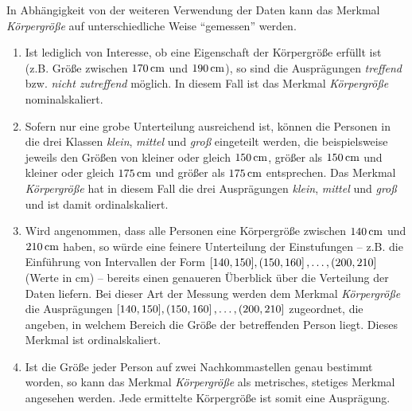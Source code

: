 \documentclass{lecture}
\begin{document}
    \begin{example}
        In Abhängigkeit von der weiteren Verwendung der Daten kann das Merkmal \emph{Körpergröße} auf unterschiedliche Weise ``gemessen'' werden.
        \begin{enumerate}
            \item Ist lediglich von Interesse, ob eine Eigenschaft der Körpergröße erfüllt ist (z.B. Größe zwischen \(170\,\si{\centi\meter}\) und \(190\,\si{\centi\meter}\)), so sind die Ausprägungen \emph{treffend} bzw. \emph{nicht zutreffend} möglich.
            In diesem Fall ist das Merkmal \emph{Körpergröße} nominalskaliert.
            \item Sofern nur eine grobe Unterteilung ausreichend ist, können die Personen in die drei Klassen \emph{klein}, \emph{mittel} und \emph{groß} eingeteilt werden, die beispielsweise jeweils den Größen von kleiner oder gleich \(150\,\si{\centi\meter}\), größer als \(150\,\si{\centi\meter}\) und kleiner oder gleich \(175\,\si{\centi\meter}\) und größer als \(175\,\si{\centi\meter}\) entsprechen.
            Das Merkmal \emph{Körpergröße} hat in diesem Fall die drei Ausprägungen \emph{klein}, \emph{mittel} und \emph{groß} und ist damit ordinalskaliert.
            \item Wird angenommen, dass alle Personen eine Körpergröße zwischen \(140\,\si{\centi\meter}\) und \(210\,\si{\centi\meter}\) haben, so würde eine feinere Unterteilung der Einstufungen -- z.B. die Einführung von Intervallen der Form \(\brackets*{140, 150}, \left(150, 160\right], \ldots, \left(200, 210\right]\) (Werte in \si{\centi\meter}) -- bereits einen genaueren Überblick über die Verteilung der Daten liefern.
            Bei dieser Art der Messung werden dem Merkmal \emph{Körpergröße} die Ausprägungen \(\brackets*{140, 150}, \left(150, 160\right], \ldots, \left(200, 210\right]\) zugeordnet, die angeben, in welchem Bereich die Größe der betreffenden Person liegt.
            Dieses Merkmal ist ordinalskaliert.
            \item Ist die Größe jeder Person auf zwei Nachkommastellen genau bestimmt worden, so kann das Merkmal \emph{Körpergröße} als metrisches, stetiges Merkmal angesehen werden.
            Jede ermittelte Körpergröße ist somit eine Ausprägung.
        \end{enumerate}
    \end{example}
\end{document}
